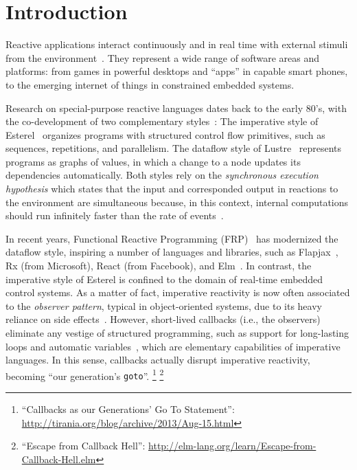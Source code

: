 \documentclass{sigplanconf}
\newcommand{\code}[1] {{\small{\texttt{#1}}}}
\newcommand{\1}{\;}
\newcommand{\2}{\;\;}
\newcommand{\3}{\;\;\;}
\newcommand{\5}{\;\;\;\;\;}
\begin{document}

\section{Introduction}
\label{sec.intro}

Reactive applications interact continuously and in real time with external 
stimuli from the environment~\cite{statecharts.reactive,rp.synchronous}.
They represent a wide range of software areas and platforms: from games in 
powerful desktops and ``apps'' in capable smart phones, to the emerging 
internet of things in constrained embedded systems.

Research on special-purpose reactive languages dates back to the early 80's, 
with the co-development of two complementary 
styles~\cite{rp.twelve,rp.hypothesis}:
%
The imperative style of Esterel~\cite{esterel.ieee91} organizes programs with 
structured control flow primitives, such as sequences, repetitions, and 
parallelism.
%
The dataflow style of Lustre~\cite{lustre.ieee91} represents programs as graphs 
of values, in which a change to a node updates its dependencies automatically.
%
Both styles rely on the \emph{synchronous execution hypothesis} which states 
that the input and corresponded output in reactions to the environment are 
simultaneous because, in this context, internal computations should run 
infinitely faster than the rate of events~\cite{rp.hypothesis}.

In recent years, Functional Reactive Programming (FRP)~\cite{frp.principles} 
has modernized the dataflow style, inspiring a number of languages and 
libraries, such as Flapjax~\cite{frp.flapjax}, Rx (from Microsoft), React (from 
Facebook), and Elm~\cite{frp.elm}.
%
In contrast, the imperative style of Esterel is confined to the domain of 
real-time embedded control systems.
%
As a matter of fact, imperative reactivity is now often associated to the 
\emph{observer pattern}, typical in object-oriented systems, due to its heavy
reliance on side effects~\cite{rp.deprecating,rp.rescala,gamepatterns}.
%
However, short-lived callbacks (i.e., the observers) eliminate any vestige of 
structured programming, such as support for long-lasting loops and automatic 
variables~\cite{sync_async.cooperative}, which are elementary capabilities of 
imperative languages.
%
In this sense, callbacks actually disrupt imperative reactivity, becoming ``our 
generation's \code{goto}''.%
\footnote{``Callbacks as our Generations' Go To Statement'':
\url{http://tirania.org/blog/archive/2013/Aug-15.html}}%
\footnote{``Escape from Callback Hell'':
\url{http://elm-lang.org/learn/Escape-from-Callback-Hell.elm}}
\end{document}
